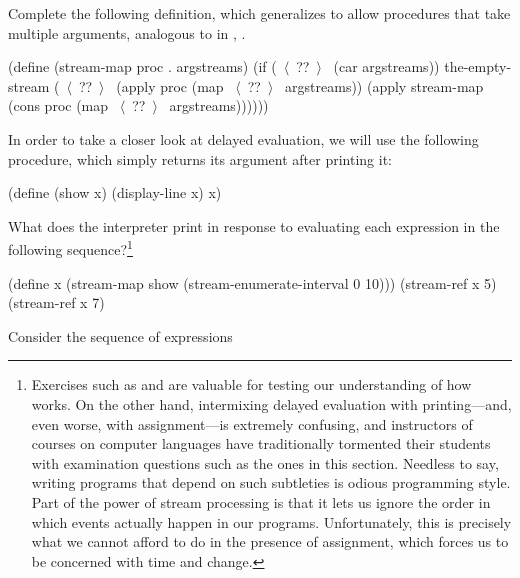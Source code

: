 \begin{exerciseGroup}
\label{Exercise 3.50}
 Complete the following
definition, which generalizes  to allow procedures that take
multiple arguments, analogous to  in ,
.

\begin{codeBlock}
(define (stream-map proc . argstreams)
  (if (~\(\langle \)~??~\(\rangle \)~ (car argstreams))
      the-empty-stream
      (~\(\langle \)~??~\(\rangle \)~
       (apply proc (map ~\(\langle \)~??~\(\rangle \)~ argstreams))
       (apply stream-map
              (cons proc (map ~\(\langle \)~??~\(\rangle \)~ argstreams))))))
\end{codeBlock}

\label{Exercise 3.51}
 In order to take a closer look at
delayed evaluation, we will use the following procedure, which simply returns
its argument after printing it:

\begin{codeBlock}
(define (show x)
  (display-line x)
  x)
\end{codeBlock}

What does the interpreter print in response to evaluating each expression in
the following sequence?\footnote{Exercises such as  and
 are valuable for testing our understanding of how
 works.  On the other hand, intermixing delayed evaluation with
printing---and, even worse, with assignment---is extremely confusing, and
instructors of courses on computer languages have traditionally tormented their
students with examination questions such as the ones in this section.  Needless
to say, writing programs that depend on such subtleties is odious programming
style.  Part of the power of stream processing is that it lets us ignore the
order in which events actually happen in our programs.  Unfortunately, this is
precisely what we cannot afford to do in the presence of assignment, which
forces us to be concerned with time and change.}

\begin{codeBlock}
(define x
  (stream-map show
              (stream-enumerate-interval 0 10)))
(stream-ref x 5)
(stream-ref x 7)
\end{codeBlock}

\label{Exercise 3.52}
 Consider the sequence of
expressions


\end{exerciseGroup}
